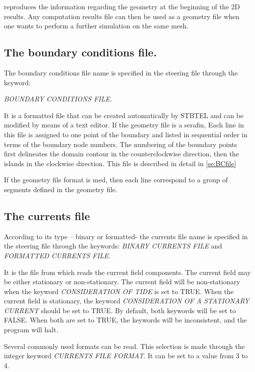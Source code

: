  \tomawac reproduces the information regarding the geometry at the beginning of the 2D results. Any computation results file can then be used as a geometry file when one wants to perform a further simulation on the same mesh.


\subsection{ The boundary conditions file. }

 The boundary conditions file name is specified in the steering file through the keyword: 

\textit{BOUNDARY CONDITIONS FILE.}

It is a formatted file that can be created automatically by STBTEL and can be modified by means of a text editor.
If the geometry file is a serafin, Each line in this file is assigned to one point of the boundary and listed in sequential order in terms of the boundary node numbers. The numbering of the boundary points first delineates the domain contour in the counterclockwise direction, then the islands in the clockwise direction. This file is described in detail in \ref{se:BCfile}

If the geometry file format is med, then each line correspond to a group of segments defined in the geometry file.

\subsection{ The currents file}
\label{se:currentfile}
 According to its type -- binary or formatted- the currents file name is specified in the steering file through the keywords: \textit{BINARY CURRENTS FILE} and\textit{ FORMATTED CURRENTS FILE.}

 It is the file from which \tomawac reads the current field components. The current field may be either stationary or non-stationary. The current field will be non-stationary when the keyword \textit{CONSIDERATION OF TIDE }is set to TRUE. When the current field is stationary, the keyword \textit{CONSIDERATION OF A STATIONARY CURRENT} should be set to TRUE. By default, both keywords will be set to FALSE. When both are set to TRUE, the keywords will be inconsistent, and the program will halt.

 Several commonly used formats can be read. This selection is made through the integer keyword \textit{CURRENTS FILE FORMAT}. It can be set to a value from 3 to 4.

